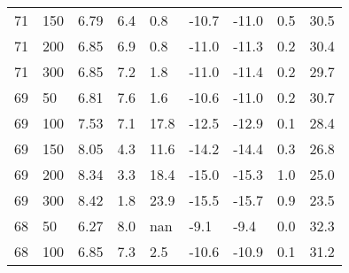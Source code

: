 \begin{tabular}{lx{0.8cm}x{1.4cm}x{0.7cm}x{1cm}x{0.8cm}x{0.8cm}x{0.7cm}x{1.9cm}}
  71 &                       150 &                                        6.79 &                  6.4 &                            0.8 &                -10.7 &                   -11.0 & 0.5 &                                         30.5 \\
  71 &                       200 &                                        6.85 &                  6.9 &                            0.8 &                -11.0 &                   -11.3 & 0.2 &                                         30.4 \\
  71 &                       300 &                                        6.85 &                  7.2 &                            1.8 &                -11.0 &                   -11.4 & 0.2 &                                         29.7 \\
  69 &                        50 &                                        6.81 &                  7.6 &                            1.6 &                -10.6 &                   -11.0 & 0.2 &                                         30.7 \\
  69 &                       100 &                                        7.53 &                  7.1 &                           17.8 &                -12.5 &                   -12.9 & 0.1 &                                         28.4 \\
  69 &                       150 &                                        8.05 &                  4.3 &                           11.6 &                -14.2 &                   -14.4 & 0.3 &                                         26.8 \\
  69 &                       200 &                                        8.34 &                  3.3 &                           18.4 &                -15.0 &                   -15.3 & 1.0 &                                         25.0 \\
  69 &                       300 &                                        8.42 &                  1.8 &                           23.9 &                -15.5 &                   -15.7 & 0.9 &                                         23.5 \\
  68 &                        50 &                                        6.27 &                  8.0 &                            nan &                 -9.1 &                    -9.4 & 0.0 &                                         32.3 \\
  68 &                       100 &                                        6.85 &                  7.3 &                            2.5 &                -10.6 &                   -10.9 & 0.1 &                                         31.2 \\

\end{tabular}
